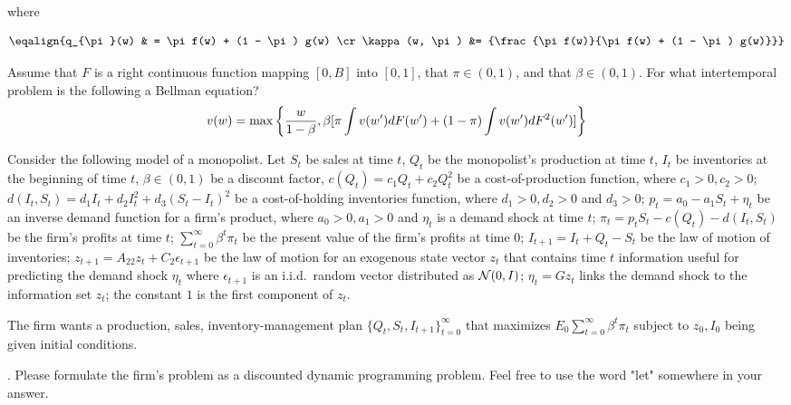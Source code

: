 where

$$
\eqalign{q_{\pi}(w) & = \pi f(w) + (1 - \pi) g(w) \cr
\kappa(w, \pi)  &= {\frac{\pi f(w)}{\pi f(w) + (1 - \pi) g(w)}}}
$$


\bye

\medskip

  Assume that  $F$ is a   right continuous function mapping $[0, B]$ into $[0,1]$, that $\pi \in (0,1)$, and  that $\beta \in (0,1)$.
For what intertemporal problem is the following a Bellman equation?
$$ v(w) = \max\left\{ {w\over{1-\beta}},  \beta [  \pi \int v(w') d F(w') + (1-\pi) \int v(w') d F^2(w') ]  \right\} $$

\medskip



\medskip
{} Consider the following model of a monopolist.  Let  $S_t$ be sales at time $t$, $Q_t$ be the monopolist's production  at time $t$,
 $I_t$ be inventories at the beginning of time $t$,  $\beta \in (0,1)$ be a discount factor,  $c(Q_t) = c_1 Q_t + c_2 Q_t^2$ be a cost-of-production function, where $c_1>0, c_2>0$;
  $d(I_t, S_t) = d_1 I_t + d_2 I_t^2  + d_3 (S_t - I_t)^2$ be a cost-of-holding inventories function, where $d_1 >0, d_2 >0 $ and $d_3 >0$;
$p_t = a_0 - a_1 S_t + \eta_t $ be an inverse demand function for a firm's product, where $a_0>0, a_1 >0$ and $\eta_t$ is a demand shock at time  $t$;
   $\pi_t = p_t S_t - c(Q_t) - d(I_t, S_t) $ be the firm's profits at time $t$;
   $\sum_{t=0}^\infty \beta^t \pi_t $ be the present value of the firm's profits at time $0$;  $I_{t+1} = I_t + Q_t - S_t$ be the law of motion of inventories;
 $z_{t+1} = A_{22} z_t + C_2 \epsilon_{t+1} $ be the law of motion for an exogenous state vector $z_t$ that contains time $t$ information useful for predicting the demand shock $\eta_t$ where
 $\epsilon_{t+1}$ is an i.i.d.~random vector distributed as ${\cal N}(0,I)$;
   $\eta_t = G z_t $ links the demand shock to the information set $z_t$;
   the constant $1$ is the first component of $z_t$.

   The firm wants  a production, sales, inventory-management plan $\{Q_t, S_t, I_{t+1}\}_{t=0}^\infty$ that maximizes $E_0 \sum_{t=0}^\infty \beta^t \pi_t $
   subject to $z_0,  I_0 $ being given initial conditions.


 . Please formulate the firm's  problem as a discounted dynamic programming problem.  Feel free to use  the word "let" somewhere in your answer.

 \medskip


